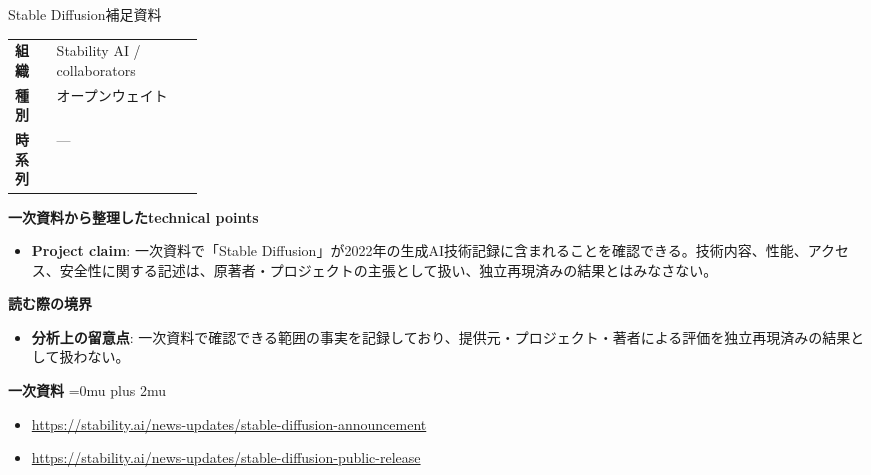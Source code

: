\begin{technicalnote}{Stable Diffusion}{補足資料}
\begingroup
\begin{tabularx}{\linewidth}{@{}>{\bfseries}p{0.22\linewidth}X@{}}
組織 & Stability AI / collaborators \\
種別 & オープンウェイト \\
時系列 & — \\
\end{tabularx}
\smallskip
{\bfseries 一次資料から整理したtechnical points}
\begin{itemize}[leftmargin=1.5em,itemsep=0.35em]
\item \textbf{Project claim}: 一次資料で「Stable Diffusion」が2022年の生成AI技術記録に含まれることを確認できる。技術内容、性能、アクセス、安全性に関する記述は、原著者・プロジェクトの主張として扱い、独立再現済みの結果とはみなさない。
\end{itemize}
\begin{minipage}{\linewidth}
{\bfseries 読む際の境界}
\begin{itemize}[leftmargin=1.5em,itemsep=0.35em]
\item \textbf{分析上の留意点}: 一次資料で確認できる範囲の事実を記録しており、提供元・プロジェクト・著者による評価を独立再現済みの結果として扱わない。
\end{itemize}
\begin{samepage}
{\bfseries 一次資料}
\begingroup\sloppy
\Urlmuskip=0mu plus 2mu\relax
\begin{itemize}[leftmargin=1.5em,itemsep=0.25em]
\item {\scriptsize\url{https://stability.ai/news-updates/stable-diffusion-announcement}}
\item {\scriptsize\url{https://stability.ai/news-updates/stable-diffusion-public-release}}
\end{itemize}
\endgroup
\end{samepage}
\end{minipage}
\endgroup
\end{technicalnote}
\medskip

